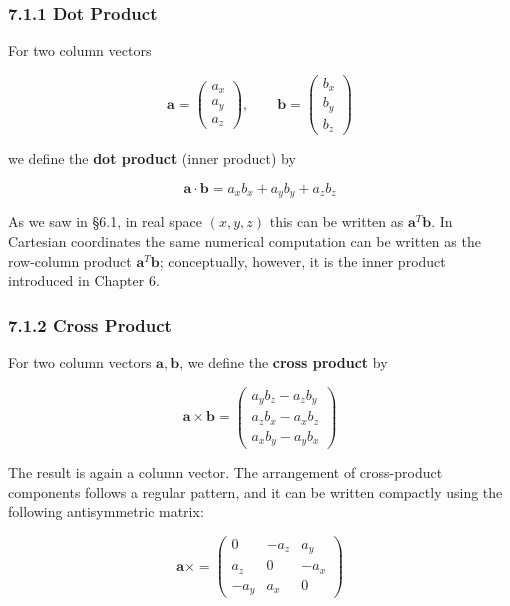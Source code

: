 \documentclass[a4paper,12pt,openany]{book}
\begin{document}
\hypertarget{dot-product}{%
\subsubsection{7.1.1 Dot Product}\label{dot-product}}

For two column vectors

\[
\mathbf{a}
=
\begin{pmatrix}
a_x\\
a_y\\
a_z
\end{pmatrix},
\qquad
\mathbf{b}
=
\begin{pmatrix}
b_x\\
b_y\\
b_z
\end{pmatrix}
\]

we define the \textbf{dot product} (inner product) by

\[\mathbf{a} \cdot \mathbf{b} = a_x b_x + a_y b_y + a_z b_z\]

As we saw in §6.1, in real space \((x,y,z)\) this can be written as
\(\mathbf{a}^T \mathbf{b}\). In Cartesian coordinates the same numerical
computation can be written as the row-column product
\(\mathbf a^T\mathbf b\); conceptually, however, it is the inner product
introduced in Chapter 6.

\hypertarget{cross-product}{%
\subsubsection{7.1.2 Cross Product}\label{cross-product}}

For two column vectors \(\mathbf{a}, \mathbf{b}\), we define the
\textbf{cross product} by

\[\mathbf{a} \times \mathbf{b} = \begin{pmatrix}
a_y b_z - a_z b_y \\
a_z b_x - a_x b_z \\
a_x b_y - a_y b_x
\end{pmatrix}\]

The result is again a column vector. The arrangement of cross-product
components follows a regular pattern, and it can be written compactly
using the following antisymmetric matrix:

\[\mathbf{a} \times = \begin{pmatrix}
0 & -a_z & a_y \\
a_z & 0 & -a_x \\
-a_y & a_x & 0
\end{pmatrix}\]
\end{document}
